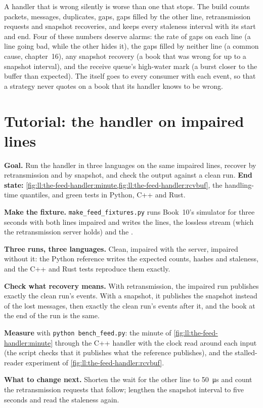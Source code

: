 A handler that is wrong silently is worse than one that stops. The build counts packets, messages, duplicates, gaps, gaps
filled by the other line, retransmission requests and snapshot recoveries, and keeps every staleness interval with its start
and end. Four of these numbers deserve alarms: the rate of gaps on each line (a line going bad, while the other hides it), the
gaps filled by neither line (a common cause, chapter~16), any snapshot recovery (a book that was wrong for up to a snapshot
interval), and the receive queue's high-water mark (a burst closer to the buffer than expected). The  itself goes
to every consumer with each event, so that a strategy never quotes on a book that its handler knows to be wrong.

\section{Tutorial: the handler on impaired lines}\label{tut:ll:the-feed-handler:tut}

\begin{tutorial}
\textbf{Goal.} Run the handler in three languages on the same impaired lines, recover by retransmission and by snapshot, and
check the output against a clean run. \textbf{End state:} \cref{fig:ll:the-feed-handler:minute,fig:ll:the-feed-handler:rcvbuf},
the handling-time quantiles, and green tests in Python, C++ and Rust.
\begin{tutsteps}
\item \textbf{Make the fixture.} \texttt{make\_feed\_fixtures.py} runs Book~10's simulator for three seconds with both lines
impaired and writes the lines, the lossless stream (which the retransmission server holds) and the .
\item \textbf{Three runs, three languages.} Clean, impaired with the server, impaired without it: the Python reference writes
the expected counts, hashes and staleness, and the C++ and Rust tests reproduce them exactly.
\item \textbf{Check what recovery means.} With retransmission, the impaired run publishes exactly the clean run's events. With
a snapshot, it publishes the snapshot instead of the lost messages, then exactly the clean run's events after it, and the book
at the end of the run is the same.
\item \textbf{Measure} with \texttt{python bench\_feed.py}: the minute of \cref{fig:ll:the-feed-handler:minute} through the
C++ handler with the clock read around each input (the script checks that it publishes what the reference publishes), and the
stalled-reader experiment of \cref{fig:ll:the-feed-handler:rcvbuf}.
\end{tutsteps}
\textbf{What to change next.} Shorten the wait for the other line to \qty{50}{\micro\second} and count the retransmission requests
that follow; lengthen the snapshot interval to five seconds and read the staleness again.
\end{tutorial}

